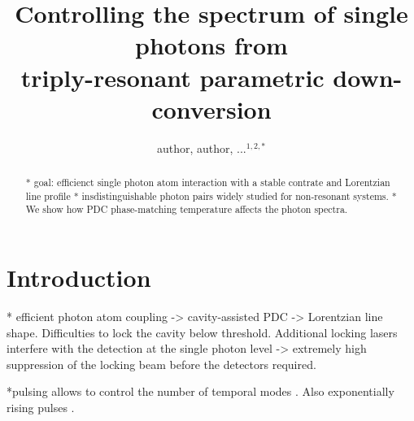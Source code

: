 \documentclass[aps,pra,showpacs,reprint,onecolumn,notitlepage]{revtex4-1}
\begin{document}
\title{Controlling the spectrum of single photons from\\ triply-resonant parametric down-conversion}
\author{author, author, ...$^{1,2,*}$}


\begin{abstract}
* goal: efficienct single photon atom interaction with a stable contrate and Lorentzian line profile 
* insdistinguishable photon pairs widely studied for non-resonant systems. 
* We show how PDC phase-matching temperature affects the photon spectra.
\end{abstract}

\maketitle 

\tableofcontents

\section{Introduction}
* efficient photon atom coupling -> cavity-assisted PDC -> Lorentzian line shape. Difficulties to lock the cavity below threshold. Additional locking lasers interfere with the detection at the single photon level -> extremely high suppression of the locking beam before the detectors required.  

*pulsing allows to control the number of temporal modes \cite{Brecht2015}. Also exponentially rising pulses \cite{Sych2015}.
\end{document}
